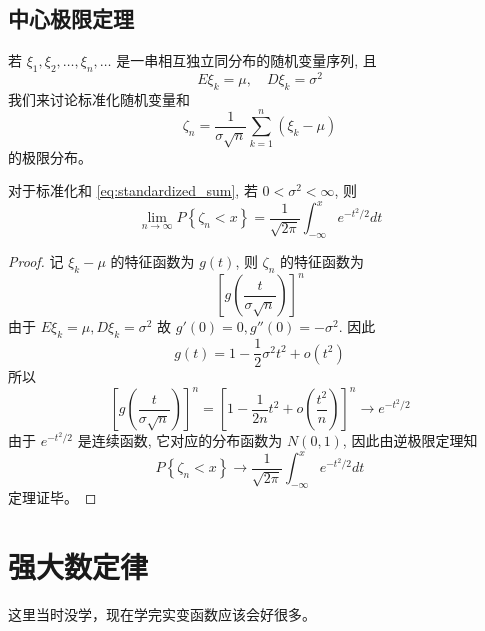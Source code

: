 \subsection{中心极限定理}\label{subsec:中心极限定理}
若 $\xi_1, \xi_2, \ldots, \xi_n, \ldots$ 是一串相互独立同分布的随机变量序列, 且
\begin{equation} \label{eq:expectation_variance}
E\xi_k=\mu, \quad D\xi_k=\sigma^2
\end{equation}
我们来讨论标准化随机变量和
\begin{equation} \label{eq:standardized_sum}
\zeta_n = \frac{1}{\sigma\sqrt{n}}\sum_{k=1}^n (\xi_k - \mu)
\end{equation}
的极限分布。

\begin{theorem} \label{thm:lindeberg_levy_clt}
对于标准化和 \eqref{eq:standardized_sum}, 若 $0<\sigma^2<\infty$, 则
\begin{equation} \label{eq:clt_limit}
\lim_{n\to\infty} P\left\{\zeta_n < x\right\} = \frac{1}{\sqrt{2\pi}}\int_{-\infty}^x e^{-t^2/2} dt
\end{equation}
\end{theorem}

\begin{proof}
记 $\xi_k-\mu$ 的特征函数为 $g(t)$, 则 $\zeta_n$ 的特征函数为
\[
\left[g\left(\frac{t}{\sigma\sqrt{n}}\right)\right]^n
\]
由于 $E\xi_k=\mu, D\xi_k=\sigma^2$ 故 $g'(0)=0, g''(0)=-\sigma^2$. 因此
\begin{equation} \label{eq:g_t_expansion}
g(t) = 1 - \frac{1}{2}\sigma^2 t^2 + o(t^2)
\end{equation}
所以
\begin{equation} \label{eq:char_func_zeta_n_limit}
\left[g\left(\frac{t}{\sigma\sqrt{n}}\right)\right]^n = \left[1 - \frac{1}{2n}t^2 + o\left(\frac{t^2}{n}\right)\right]^n \to e^{-t^2/2}
\end{equation}
由于 $e^{-t^2/2}$ 是连续函数, 它对应的分布函数为 $N(0,1)$, 因此由逆极限定理知
\[
P\left\{\zeta_n < x\right\} \to \frac{1}{\sqrt{2\pi}}\int_{-\infty}^x e^{-t^2/2} dt
\]
定理证毕。
\end{proof}
\section{强大数定律}\label{sec:强大数定律}
这里当时没学，现在学完实变函数应该会好很多。
